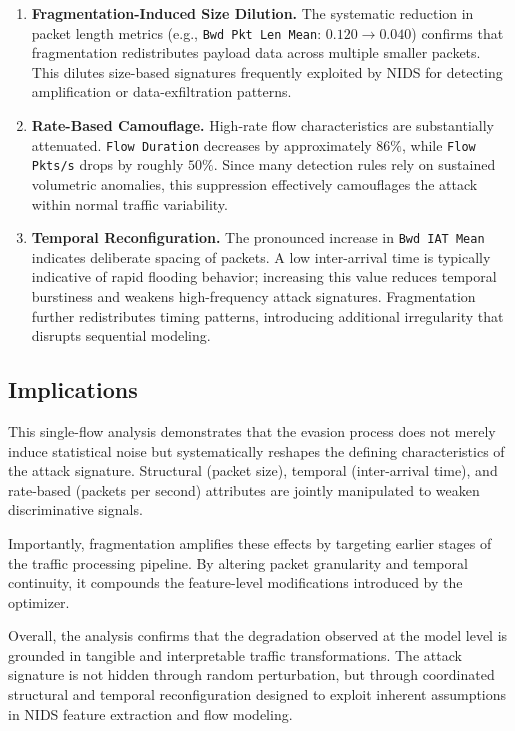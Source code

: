 \begin{enumerate}
    \item \textbf{Fragmentation-Induced Size Dilution.}  
    The systematic reduction in packet length metrics (e.g., \texttt{Bwd Pkt Len Mean}: $0.120 \rightarrow 0.040$) confirms that fragmentation redistributes payload data across multiple smaller packets. This dilutes size-based signatures frequently exploited by NIDS for detecting amplification or data-exfiltration patterns.

    \item \textbf{Rate-Based Camouflage.}  
    High-rate flow characteristics are substantially attenuated.  
    \texttt{Flow Duration} decreases by approximately $86\%$, while \texttt{Flow Pkts/s} drops by roughly $50\%$.  
    Since many detection rules rely on sustained volumetric anomalies, this suppression effectively camouflages the attack within normal traffic variability.

    \item \textbf{Temporal Reconfiguration.}  
    The pronounced increase in \texttt{Bwd IAT Mean} indicates deliberate spacing of packets. A low inter-arrival time is typically indicative of rapid flooding behavior; increasing this value reduces temporal burstiness and weakens high-frequency attack signatures. Fragmentation further redistributes timing patterns, introducing additional irregularity that disrupts sequential modeling.
\end{enumerate}

\subsection{Implications}

This single-flow analysis demonstrates that the evasion process does not merely induce statistical noise but systematically reshapes the defining characteristics of the attack signature. Structural (packet size), temporal (inter-arrival time), and rate-based (packets per second) attributes are jointly manipulated to weaken discriminative signals.

Importantly, fragmentation amplifies these effects by targeting earlier stages of the traffic processing pipeline. By altering packet granularity and temporal continuity, it compounds the feature-level modifications introduced by the optimizer.

Overall, the analysis confirms that the degradation observed at the model level is grounded in tangible and interpretable traffic transformations. The attack signature is not hidden through random perturbation, but through coordinated structural and temporal reconfiguration designed to exploit inherent assumptions in NIDS feature extraction and flow modeling.


